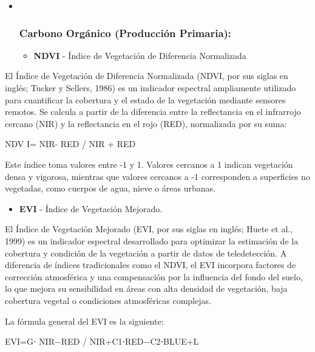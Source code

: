 \documentclass[
]{book}
\providecommand{\tightlist}{%
  \setlength{\itemsep}{0pt}\setlength{\parskip}{0pt}}
\begin{document}
\begin{itemize}
\item ~
  \subsubsection{\texorpdfstring{\textbf{Carbono Orgánico (Producción Primaria):}}{Carbono Orgánico (Producción Primaria):}}\label{carbono-orguxe1nico-producciuxf3n-primaria}

  \begin{itemize}
  \tightlist
  \item
    \textbf{NDVI} - Índice de Vegetación de Diferencia Normalizada
  \end{itemize}
\end{itemize}

El Índice de Vegetación de Diferencia Normalizada (NDVI, por sus siglas en inglés; Tucker y Sellers, 1986) es un indicador espectral ampliamente utilizado para cuantificar la cobertura y el estado de la vegetación mediante sensores remotos. Se calcula a partir de la diferencia entre la reflectancia en el infrarrojo cercano (NIR) y la reflectancia en el rojo (RED), normalizada por su suma:

NDV I= NIR- RED / NIR + RED

Este índice toma valores entre -1 y 1. Valores cercanos a 1 indican vegetación densa y vigorosa, mientras que valores cercanos a -1 corresponden a superficies no vegetadas, como cuerpos de agua, nieve o áreas urbanas.

\begin{itemize}
\tightlist
\item
  \textbf{EVI} - Índice de Vegetación Mejorado.
\end{itemize}

El Índice de Vegetación Mejorado (EVI, por sus siglas en inglés; Huete et al., 1999) es un indicador espectral desarrollado para optimizar la estimación de la cobertura y condición de la vegetación a partir de datos de teledetección. A diferencia de índices tradicionales como el NDVI, el EVI incorpora factores de corrección atmosférica y una compensación por la influencia del fondo del suelo, lo que mejora su sensibilidad en áreas con alta densidad de vegetación, baja cobertura vegetal o condiciones atmosféricas complejas.

La fórmula general del EVI es la siguiente:

EVI=G⋅ NIR−RED / NIR+C1\hspace{0pt}⋅RED−C2\hspace{0pt}⋅BLUE+L
\end{document}
